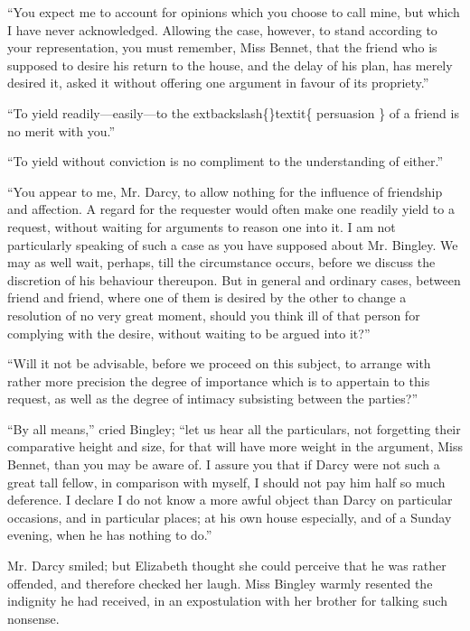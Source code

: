 \documentclass[10pt]{book}
\begin{document}
   “You expect me to account for opinions which you choose to call mine,
but which I have never acknowledged. Allowing the case, however, to
stand according to your representation, you must remember, Miss Bennet,
that the friend who is supposed to desire his return to the house,
   and
the delay of his plan, has merely desired it, asked it without offering
one argument in favour of its propriety.”
  

   “To yield readily—easily—to the
   	extbackslash\{\}textit\{
    persuasion
   \}
   of a friend is no merit
with you.”
  

   “To yield without conviction is no compliment to the understanding of
either.”
  

   “You appear to me, Mr. Darcy, to allow nothing for the influence of
friendship and affection. A regard for the requester would often make
one readily yield to a request, without waiting for arguments to reason
one into it. I am not particularly speaking of such a case as you have
supposed about Mr. Bingley. We may as well wait, perhaps, till the
circumstance occurs, before we discuss the discretion of his behaviour
thereupon. But in general and ordinary cases, between friend and friend,
where one of them is desired by the other to change a resolution of no
very great moment, should you think ill of that person for complying
with the desire, without waiting to be argued into it?”
  

   “Will it not be advisable, before we proceed on this subject, to arrange
with rather more precision the degree of importance which is to
appertain to this request, as well as the degree of intimacy subsisting
between the parties?”
  

   “By all means,” cried Bingley; “let us hear all the particulars, not
forgetting their comparative height and size, for that will have more
weight in the argument, Miss Bennet, than you may be aware of. I assure
you that if Darcy were not such a great tall fellow, in comparison with
myself, I should not pay him half so much deference. I declare I do not
know a more awful object than Darcy on particular occasions, and in
   particular places; at his own house especially, and of a Sunday evening,
when he has nothing to do.”
  

   Mr. Darcy smiled; but Elizabeth thought she could perceive that he was
rather offended, and therefore checked her laugh. Miss Bingley warmly
resented the indignity he had received, in an expostulation with her
brother for talking such nonsense.
  
\end{document}
